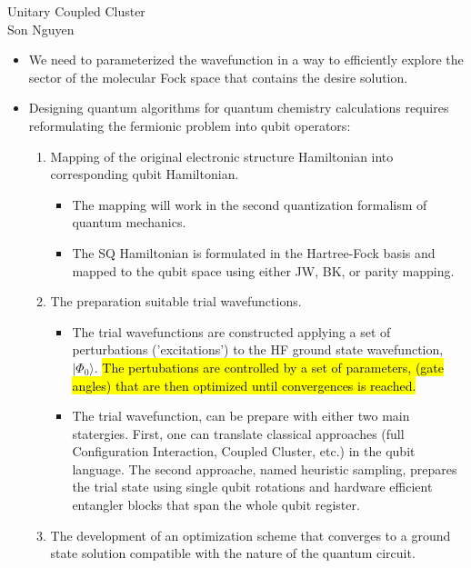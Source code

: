 \documentclass{article}
\begin{document}
\begin{center}
    \LARGE{Unitary Coupled Cluster}\\[1em]
    \large Son Nguyen\\[1em]
\end{center}

\onehalfspacing
\begin{itemize}
    \item We need to parameterized the wavefunction in a way to efficiently explore the sector of the molecular Fock space that contains the desire solution.
    \item Designing quantum algorithms for quantum chemistry calculations requires reformulating the fermionic problem into qubit operators:
    \begin{enumerate}
        \item Mapping of the original electronic structure Hamiltonian into corresponding qubit Hamiltonian.
        \begin{itemize}
            \item The mapping will work in the second quantization formalism of quantum mechanics.
            \item The SQ Hamiltonian is formulated in the Hartree-Fock basis and mapped to the qubit space using either JW, BK, or parity mapping. 
        \end{itemize}
        \item The preparation suitable trial wavefunctions.
        \begin{itemize}
            \item The trial wavefunctions are constructed applying a set of perturbations ('excitations') to the HF ground state wavefunction, \(|\Phi_0\rangle\). \hl{ The pertubations are controlled by a set of parameters, (gate angles) that are then optimized until convergences is reached.}
            \item The trial wavefunction, can be prepare with either two main statergies. First, one can translate classical approaches (full Configuration Interaction, Coupled Cluster, etc.) in the qubit language. The second approache, named heuristic sampling, prepares the trial state using single qubit rotations and hardware efficient entangler blocks that span the whole qubit register. 
        \end{itemize}
        \item The development of an optimization scheme that converges to a ground state solution compatible with the nature of the quantum circuit.
    \end{enumerate}
\end{itemize}
\end{document}
